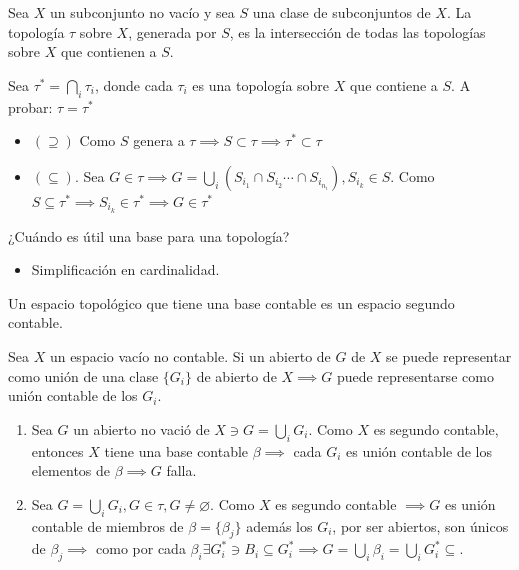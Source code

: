 \begin{teorema}
    Sea $X$ un subconjunto no vacío y sea $S$ una clase de subconjuntos de $X$. La topología $\tau$ sobre $X$, generada por $S$, es la intersección de todas las topologías sobre $X$ que contienen a $S$. 
    \begin{dem}
        Sea $\tau^*=\bigcap_i\tau_i$, donde cada $\tau_i$ es una topología sobre $X$ que contiene a $S$. A probar: $\tau=\tau^*$

        \begin{itemize}
            \item $(\supseteq)$ Como $S$ genera a $\tau\implies S\subset \tau\implies \tau^*\subset\tau $
            \item $(\subseteq)$. Sea $G\in\tau\implies G=\bigcup_i\left(S_{i_1}\cap S_{i_2}\cdots \cap S_{i_{n_i}}\right), S_{i_k}\in S$. Como $S\subseteq \tau^*\implies S_{i_k}\in\tau^*\implies G\in \tau^*$ 
        \end{itemize}
    \end{dem}
\end{teorema}
\begin{cajita}
    ¿Cuándo es útil una base para una topología?
    \begin{itemize}
        \item Simplificación en cardinalidad.
    \end{itemize}
\end{cajita}

\begin{definicion}
    Un espacio topológico que tiene una base contable es un espacio segundo contable. 
\end{definicion}

\begin{teorema}[de Lindelof]
    Sea $X$ un espacio vacío no contable. Si un abierto de $G$ de $X$ se puede representar como unión de una clase $\{G_i\}$ de abierto de $X\implies G$ puede representarse como unión contable de los $G_i$. 
    \begin{dem}
        \begin{enumerate}
            \item Sea $G$ un abierto no vació de $X\ni G=\bigcup_i G_i$. Como $X$ es segundo contable, entonces $X$ tiene una base contable $\beta\implies $ cada $G_i$ es unión contable de los elementos de $\beta\implies G$  falla. 
            \item Sea $G=\bigcup_i G_i,G\in\tau,G\neq \varnothing$. Como $X$ es segundo contable $\implies G$ es unión contable de miembros de $\beta=\{\beta_j\}$ además los $G_i$, por ser abiertos, son únicos de $\beta_j\implies$ como por cada $\beta_i\exists G_i^*\ni B_i\subseteq G_i^*\implies G=\bigcup_i \beta_i=\bigcup_i G_i^*\subseteq$. 
        \end{enumerate}
        
    \end{dem}
\end{teorema}

